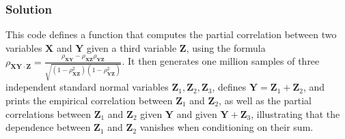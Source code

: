 \documentclass[letterpaper,10pt,english]{jupyterBook}
\begin{document}
\subsubsection{Solution}
\label{\detokenize{01:id11}}
\sphinxAtStartPar
This code defines a function  that computes the partial correlation between two variables \(\mathbf X\) and \(\mathbf Y\) given a third variable \(\mathbf Z\), using the formula \(\rho_{\mathbf X\mathbf Y \cdot \mathbf Z} = \frac{\rho_{\mathbf X\mathbf Y} - \rho_{\mathbf X\mathbf Z}\rho_{\mathbf Y\mathbf Z}}{\sqrt{(1 - \rho_{\mathbf X\mathbf Z}^2)(1 - \rho_{\mathbf Y\mathbf Z}^2)}}\). It then generates one million samples of three independent standard normal variables \(\mathbf Z_1, \mathbf Z_2, \mathbf Z_3\), defines \(\mathbf Y = \mathbf Z_1 + \mathbf Z_2\), and prints the empirical correlation between \(\mathbf Z_1\) and \(\mathbf Z_2\), as well as the partial correlations between \(\mathbf Z_1\) and \(\mathbf Z_2\) given \(\mathbf Y\) and given \(\mathbf Y + \mathbf Z_3\), illustrating that the dependence between \(\mathbf Z_1\) and \(\mathbf Z_2\) vanishes when conditioning on their sum.
\end{document}

